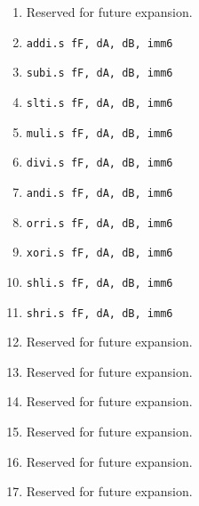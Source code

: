 \documentclass{article}
\begin{document}
\begin{itemize}
\begin{enumerate}
			\item Reserved for future expansion.

			\item \texttt{addi.s fF, dA, dB, imm6}
			\item \texttt{subi.s fF, dA, dB, imm6}
			\item \texttt{slti.s fF, dA, dB, imm6}
			\item \texttt{muli.s fF, dA, dB, imm6}

			\item \texttt{divi.s fF, dA, dB, imm6}
			\item \texttt{andi.s fF, dA, dB, imm6}
			\item \texttt{orri.s fF, dA, dB, imm6}
			\item \texttt{xori.s fF, dA, dB, imm6}

			\item \texttt{shli.s fF, dA, dB, imm6}
			\item \texttt{shri.s fF, dA, dB, imm6}
			\item Reserved for future expansion.
			\item Reserved for future expansion.

			\item Reserved for future expansion.
			\item Reserved for future expansion.
			\item Reserved for future expansion.
			\item Reserved for future expansion.
			\end{enumerate}
		\end{itemize}
\end{document}
